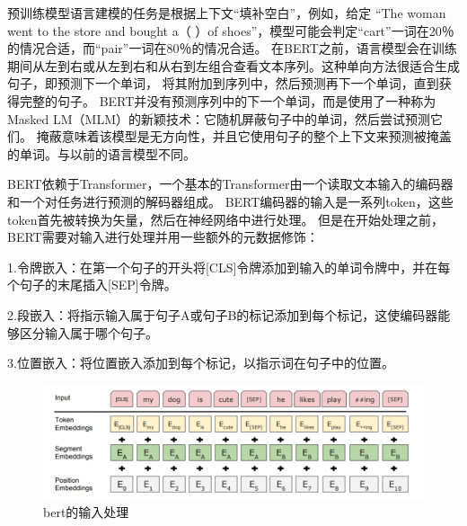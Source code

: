 预训练模型语言建模的任务是根据上下文“填补空白”\cite{marcelino2018transfer}，例如，给定
“The woman went to the store and bought a（ ）of shoes”，模型可能会判定“cart”一词在20％的情况合适，而“pair”一词在80％的情况合适。
在BERT之前，语言模型会在训练期间从左到右或从左到右和从右到左组合查看文本序列。这种单向方法很适合生成句子，即预测下一个单词，
将其附加到序列中，然后预测再下一个单词，直到获得完整的句子。
BERT并没有预测序列中的下一个单词，而是使用了一种称为Masked LM（MLM）的新颖技术：它随机屏蔽句子中的单词，然后尝试预测它们。
掩蔽意味着该模型是无方向性，并且它使用句子的整个上下文来预测被掩盖的单词。与以前的语言模型不同。


BERT依赖于Transformer，一个基本的Transformer由一个读取文本输入的编码器和一个对任务进行预测的解码器组成。
BERT编码器的输入是一系列token，这些token首先被转换为矢量，然后在神经网络中进行处理。
但是在开始处理之前，BERT需要对输入进行处理并用一些额外的元数据修饰：

1.令牌嵌入：在第一个句子的开头将[CLS]令牌添加到输入的单词令牌中，并在每个句子的末尾插入[SEP]令牌。

2.段嵌入：将指示输入属于句子A或句子B的标记添加到每个标记，这使编码器能够区分输入属于哪个句子。

3.位置嵌入：将位置嵌入添加到每个标记，以指示词在句子中的位置。
\begin{figure}[htbp]
  \centering
  \includegraphics[scale=0.5]{./images/inputBert.jpg}
  \caption{bert的输入处理\cite{devlin2018bert}}
  \label{fig:inputBert}
\end{figure}


